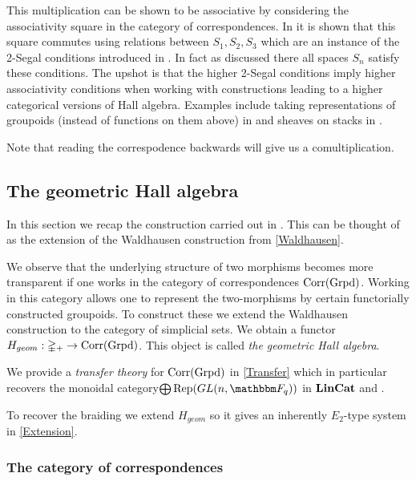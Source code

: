 This multiplication can be shown to be associative by considering the associativity square in the category of correspondences. In \cite{Dyckerhoff} it is shown that this square commutes using relations between $S_1,S_2,S_3$ which are an instance of the 2-Segal conditions introduced in \cite{KapranovDyckerhoff}. In fact as discussed there all spaces $S_n$ satisfy these conditions. The upshot is that the higher 2-Segal conditions imply higher associativity conditions when working with constructions leading to a higher categorical versions of Hall algebra. Examples include taking representations of groupoids (instead of functions on them above) in \cite{KapranovDyckerhoff} and sheaves on stacks in \cite{GeometricHallAlgebra1}.

Note that reading the correspodence backwards will give us a comultiplication.


\subsection{The geometric Hall algebra}
\label{GeneralHall}
In this section we recap the construction carried out in \cite{GeometricHallAlgebra1}. This can be thought of as the extension of the Waldhausen construction from \autoref{Waldhausen}.

We observe that the underlying structure of two morphisms becomes more transparent if one works in the  category of correspondences $\operatorname{Corr}(\operatorname{Grpd})$. Working in this category allows one to represent the two-morphisms by certain functorially constructed groupoids. To construct these we extend the Waldhausen construction to the category of simplicial sets. We obtain a functor $H_{geom}:\mathbb{\Delta}_+ \rightarrow \operatorname{Corr}(\operatorname{Grpd})$. This object is called \emph{the geometric Hall algebra}.

We provide a \emph{transfer theory} for $\operatorname{Corr}(\operatorname{Grpd})$ in \autoref{Transfer} which in particular recovers the monoidal category$\bigoplus \Rep(\GL(n,\FF_q))$ in $\operatorname{\mathbf{LinCat}}$ and . 

To recover the braiding we extend $H_{geom}$ so it gives an inherently $E_2$-type system in \autoref{Extension}.
\subsubsection{The category of correspondences}
\label{Corr}

